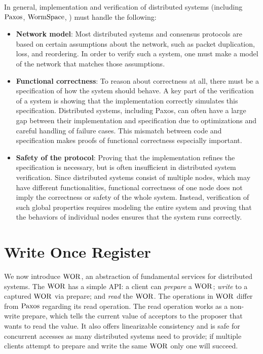 In general, implementation and verification of distributed systems
(including $\mathrm{Paxos}$, $\mathrm{WormSpace}$, \etc) must handle the following:
\begin{itemize}

\item \textbf{Network model}:
Most distributed systems and consensus protocols are based on certain assumptions about the network,
such as packet duplication, loss, and reordering. In order to verify such a system, one must make a model of the network that matches
those assumptions.

\item \textbf{Functional correctness}: 
To reason about correctness at all, there must be a specification of how the system should behave.
A key part of the verification of a system is showing that the implementation correctly simulates this specification.
Distributed systems, including Paxos, can often have a large gap between their implementation and specification due to optimizations and careful handling of failure cases.
This mismatch between code and specification makes proofs of functional correctness especially important.

\item \textbf{Safety of the protocol}: 
Proving that the implementation refines the specification is necessary, but is often insufficient in distributed system verification.
Since distributed systems consist of multiple nodes, which may have different functionalities,
functional correctness of one node does not imply the correctness or safety of the whole system.
Instead, verification of such global properties requires modeling the entire system and
proving that the behaviors of individual nodes ensures that the system runs correctly.
\end{itemize}

\section{Write Once Register}
\label{chapter:wormspace:sec:write-once-register}

We now introduce $\mathrm{WOR}$, an abstraction of fundamental services for distributed systems. 
The $\mathrm{WOR}$ has a simple API: a client can \textit{prepare} a $\mathrm{WOR}$; \textit{write} to a captured $\mathrm{WOR}$ via prepare; and \textit{read} the  $\mathrm{WOR}$. 
The operations in $\mathrm{WOR}$ differ from $\mathrm{Paxos}$ regarding its read operation. 
The read operation works as a non-write prepare, which tells the current value of acceptors to the proposer that wants to read the value.
It also offers linearizable consistency and is safe for concurrent accesses as many distributed systems need to provide; 
if multiple clients attempt to prepare and write the same $\mathrm{WOR}$ only one will succeed.

